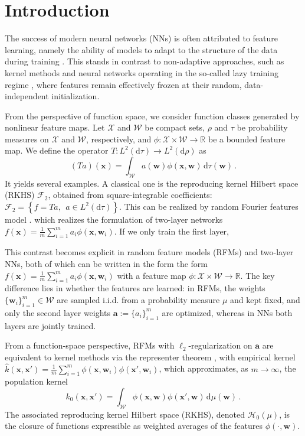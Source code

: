 \section{Introduction}
The success of modern neural networks (NNs) is often attributed to feature learning, namely the ability of models to adapt to the structure of the data during training \citep{bach2017breaking,suzuki2019adaptivity,damian2022neural}. This stands in contrast to non-adaptive approaches, such as kernel methods and neural networks operating in the so-called lazy training regime \citep{jacot2018neural,chizat2019lazy}, where features remain effectively frozen at their random, data-independent initialization.

From the perspective of function space, we consider function classes generated by nonlinear feature maps. Let $\mathcal{X}$ and $\mathcal{W}$ be compact sets, $\rho$ and $\tau$ be probability measures on $\mathcal{X}$ and $\mathcal{W}$, respectively, and $\phi: \mathcal{X} \times \mathcal{W} \rightarrow \mathbb{R}$ be a bounded feature map.
We define the operator $T : L^2(\mathrm{d}\tau) \to L^2(\mathrm{d}\rho)$ as
\begin{equation}\label{opetatorT}
(Ta)(\bm x) = \int_{\mathcal{W}} a(\bm w)\phi(\bm x, \bm w)\, \mathrm{d} \tau(\bm w)\,.
\end{equation}
It yields several examples. A classical one is the reproducing kernel Hilbert space (RKHS) $\mathcal{F}_2$, obtained from square-integrable coefficients: $\mathcal{F}_2 = \left\{ f = Ta, ~~a \in L^2(\mathrm{d}\tau) \right\}$.
This can be realized by random Fourier features model \citep{rahimi2007random}.
which realizes the formulation of two-layer networks $f(\bm x) = \frac{1}{m} \sum_{i=1}^m a_i \phi(\bm x, \bm w_i)$.
If we only train the first layer, 
\fi

This contrast becomes explicit in random feature models (RFMs) \citep{rahimi2007random} and two-layer NNs, both of which can be written in the form the form $f(\bm x) = \frac{1}{m} \sum_{i=1}^m a_i \phi(\bm x, \bm w_i)$ with a feature map $\phi: \mathcal{X} \times \mathcal{W} \rightarrow \mathbb{R}$. The key difference lies in whether the features are learned: in RFMs, the weights $\{ \bm w_i\}_{i=1}^m \in \mathcal{W}$ are sampled i.i.d. from a probability measure $\mu$ and kept fixed, and only the second layer weights $\bm a :=\{ a_i \}_{i=1}^m$ are optimized, whereas in NNs both layers are jointly trained.

From a function-space perspective, RFMs with $\ell_2$-regularization on $\bm a$ are equivalent to kernel methods via the representer theorem \citep{scholkopf2001generalized}, with empirical kernel $\hat{k}(\bm x, \bm x') = \frac{1}{m} \sum_{i=1}^m \phi(\bm x, \bm w_i)\phi(\bm x', \bm w_i)$,
which approximates, as $m \to \infty$, the population kernel
\[
k_0(\bm x, \bm x') = \int_{\mathcal{W}} \phi(\bm x, \bm w)\phi(\bm x', \bm w)\, \mathrm{d}\mu(\bm w)\,.
\]
The associated reproducing kernel Hilbert space (RKHS), denoted $\mathcal{H}_0(\mu)$, is the closure of functions expressible as weighted averages of the features $\phi(\cdot, \bm w)$.

